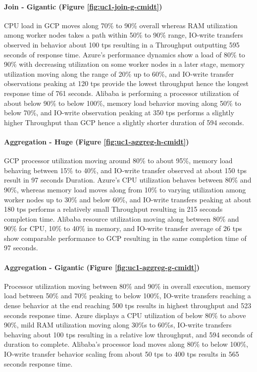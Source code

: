 \documentclass[review]{elsarticle}
\begin{document}
\paragraph{Join - Gigantic (Figure \ref{fig:uc1-join-g-cmidt})}CPU load in GCP moves along 70\% to 90\% overall whereas RAM utilization among worker nodes takes a path within 50\% to 90\% range, IO-write transfers observed in behavior about 100 tps resulting in a Throughput outputting 595 seconds of response time. Azure's performance dynamics show a load of 80\% to 90\% with decreasing utilization on some worker nodes in a later stage, memory utilization moving along the range of 20\% up to 60\%, and IO-write transfer observations peaking at 120 tps provide the lowest throughput hence the longest response time of 761 seconds. Alibaba is performing a processor utilization of about below 90\% to below 100\%, memory load behavior moving along 50\% to below 70\%, and IO-write observation peaking at 350 tps performs a slightly higher Throughput than GCP hence a slightly shorter duration of 594 seconds.

\paragraph{Aggregation - Huge (Figure \ref{fig:uc1-aggreg-h-cmidt})}GCP processor utilization moving around 80\% to about 95\%, memory load behaving between 15\% to 40\%, and IO-write transfer observed at about 150 tps result in 97 seconds Duration. Azure's CPU utilization behaves between 80\% and 90\%, whereas memory load moves along from 10\% to varying utilization among worker nodes up to 30\% and below 60\%, and IO-write transfers peaking at about 180 tps performs a relatively small Throughput resulting in 215 seconds completion time. Alibaba resource utilization moving along between 80\% and 90\% for CPU, 10\% to 40\% in memory, and IO-write transfer average of 26 tps show comparable performance to GCP resulting in the same completion time of 97 seconds.

\paragraph{Aggregation - Gigantic (Figure \ref{fig:uc1-aggreg-g-cmidt})}Processor utilization moving between 80\% and 90\% in overall execution, memory load between 50\% and 70\% peaking to below 100\%, IO-write transfers reaching a dense behavior at the end reaching 500 tps results in highest throughput and 523 seconds response time. Azure displays a CPU utilization of below 80\% to above 90\%, mild RAM utilization moving along 30\%s to 60\%s, IO-write transfers behaving about 100 tps resulting in a relative low throughput, and 594 seconds of duration to complete. Alibaba's processor load moves along 80\% to below 100\%, IO-write transfer behavior scaling from about 50 tps to 400 tps results in 565 seconds response time.
\end{document}
